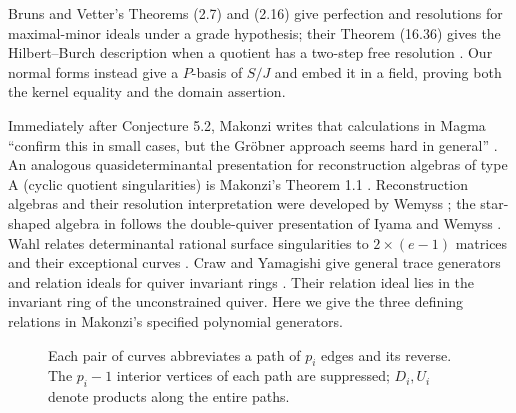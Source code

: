 \documentclass[11pt]{article}
\theoremstyle{remark}
\begin{document}
Bruns and Vetter's Theorems (2.7) and (2.16) give perfection and
resolutions for maximal-minor ideals under a grade hypothesis; their
Theorem (16.36) gives the Hilbert--Burch description when a quotient
has a two-step free resolution \cite{BV}.
Our normal forms instead give a $P$-basis of $S/J$ and embed it in a
field, proving both the kernel equality and the domain assertion.

Immediately after Conjecture 5.2, Makonzi writes that calculations in
Magma ``confirm this in small cases, but the Gr\"obner approach seems
hard in general'' \cite[p.~17, paragraph following Conjecture 5.2]{Makonzi}.
An analogous quasideterminantal presentation for reconstruction algebras
of type A (cyclic quotient singularities) is Makonzi's Theorem 1.1
\cite{TypeA}. Reconstruction algebras and their resolution interpretation were developed
by Wemyss \cite[Definition 2.3, Theorems 3.24 and 4.5]{WemyssA};
the star-shaped algebra in \cite[\S2]{Makonzi} follows the double-quiver
presentation of Iyama and Wemyss \cite[Theorem 5.7]{IW}.
Wahl relates determinantal rational surface singularities to
$2\times(e-1)$ matrices and their exceptional curves
\cite[Proposition 3.2 and Theorem 3.4]{Wahl}.
Craw and Yamagishi give general trace generators and relation ideals for
quiver invariant rings \cite[Theorems 1.1 and 4.3]{CY}.
Their relation ideal lies in the invariant ring of the unconstrained
quiver. Here we give the three defining relations in Makonzi's specified
polynomial generators.


\begin{figure}[ht]
\centering
{}
\caption{Each pair of curves abbreviates a path of $p_i$ edges and its
reverse. The $p_i-1$ interior vertices of each path are suppressed;
$D_i,U_i$ denote products along the entire paths.}\label{fig:quiver}
\end{figure}
\end{document}
